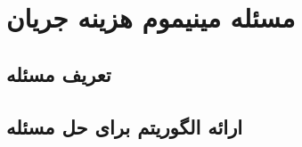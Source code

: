  \chapter[مسئله مینیموم هزینه جریان]{مسئله مینیموم هزینه جریان}
	\section[تعریف مسئله]{تعریف مسئله}
	\section[ارائه الگوریتم برای حل مسئله]{ارائه الگوریتم برای حل مسئله}